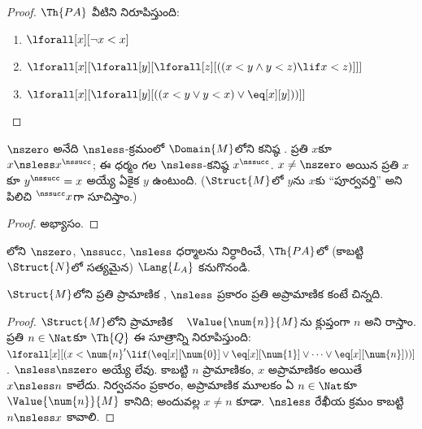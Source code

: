 \documentclass[../../../include/open-logic-section]{subfiles}
\begin{document}
\begin{proof}
$\Th{PA}$ వీటిని నిరూపిస్తుంది:
\begin{enumerate}
\item $\lforall[x][\lnot x < x]$
\item $\lforall[x][\lforall[y][\lforall[z][((x < y \land y < z) \lif x < z)]]]$
\item $\lforall[x][\lforall[y][((x < y \lor y < x) \lor \eq[x][y]))]]$
\end{enumerate}
\end{proof}

\begin{prop}
 $\nszero$ అనేది $\nsless$-క్రమంలో
$\Domain{M}$లోని కనిష్ఠ .
ప్రతి $x$కూ $x\nsless x^\nssucc$; ఈ ధర్మం గల
$\nsless$-కనిష్ఠ  $x^\nssucc$.
$x\neq\nszero$ అయిన ప్రతి $x$కూ $y^\nssucc=x$ అయ్యే ఏకైక $y$
ఉంటుంది. ($\Struct{M}$లో $y$ను $x$కు “పూర్వవర్తి” అని
పిలిచి $^\nssucc x$గా సూచిస్తాం.)
\end{prop}

\begin{proof}
అభ్యాసం.
\end{proof}

\begin{prob}
లోని $\nszero$, $\nssucc$,
$\nsless$ ధర్మాలను నిర్ధారించే, $\Th{PA}$లో
 (కాబట్టి $\Struct{N}$లో
సత్యమైన) $\Lang{L_A}$  కనుగొనండి.
\end{prob}

\begin{prop}
$\Struct{M}$లోని ప్రతి ప్రామాణిక ,
$\nsless$ ప్రకారం ప్రతి అప్రామాణిక
 కంటే చిన్నది.
\end{prop}

\begin{proof}
$\Struct{M}$లోని ప్రామాణిక ~
$\Value{\num{n}}{M}$ను క్లుప్తంగా $n$ అని రాస్తాం. ప్రతి
$n\in\Nat$కూ
$\Th{Q}$ ఈ సూత్రాన్ని నిరూపిస్తుంది:
$\lforall[x][(x<\num{n}'\lif
(\eq[x][\num{0}]\lor\eq[x][\num{1}]\lor\dots\lor
\eq[x][\num{n}]))]$. $\nsless\nszero$ అయ్యే
 లేవు. కాబట్టి $n$ ప్రామాణికం,
$x$ అప్రామాణికం అయితే $x\nsless n$ కాలేదు. నిర్వచనం ప్రకారం,
అప్రామాణిక మూలకం ఏ $n\in\Nat$కూ $\Value{\num{n}}{M}$ కానిది;
అందువల్ల $x\neq n$ కూడా. $\nsless$ రేఖీయ క్రమం కాబట్టి
$n\nsless x$ కావాలి.
\end{proof}
\end{document}

